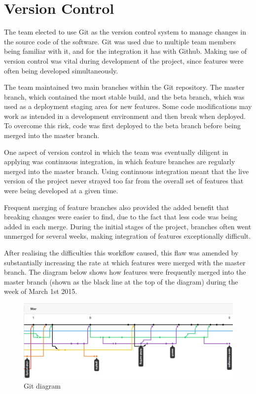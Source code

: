 \documentclass[a4paper]{l3proj}
\begin{document}
\section{Version Control}
\label{versionControl}

The team elected to use Git as the version control system to manage changes in the source code of the software. Git was used due to multiple team members being familiar with it, and for the integration it has with Github. Making use of version control was vital during development of the project, since features were often being developed simultaneously.

The team maintained two main branches within the Git repository. The master branch, which contained the most stable build, and the beta branch, which was used as a deployment staging area for new features. Some code modifications may work as intended in a development environment and then break when deployed. To overcome this risk, code was first deployed to the beta branch before being merged into the master branch.

One aspect of version control in which the team was eventually diligent in applying was continuous integration, in which feature branches are regularly merged into the master branch. Using continuous integration meant that the live version of the project never strayed too far from the overall set of features that were being developed at a given time. 

Frequent merging of feature branches also provided the added benefit that breaking changes were easier to find, due to the fact that less code was being added in each merge. During the initial stages of the project, branches often went unmerged for several weeks, making integration of features exceptionally difficult. 

After realising the difficulties this workflow caused, this flaw was amended by substantially increasing the rate at which features were merged with the master branch. The diagram below shows how features were frequently merged into the master branch (shown as the black line at the top of the diagram) during the week of March 1st 2015.

\begin{figure}[ht]
\centering
\includegraphics[scale=0.5]{diagram}
\caption{Git diagram}
\end{figure} 
 
\end{document}
